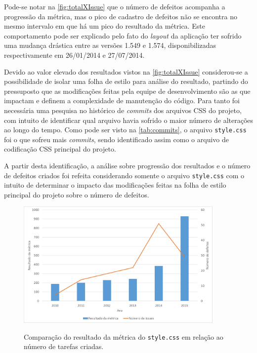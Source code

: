 Pode-se notar na \autoref{fig:totalXIssue} que o número de defeitos acompanha a progressão da métrica, mas o pico de cadastro de defeitos não se encontra no mesmo intervalo em que há um pico do resultado da métrica. Este comportamento pode ser explicado pelo fato do \textit{layout} da aplicação ter sofrido uma mudança drástica entre as versões 1.549 e 1.574, disponibilizadas respectivamente em 26/01/2014 e 27/07/2014.

Devido ao valor elevado dos resultados vistos na \autoref{fig:totalXIssue} considerou-se a possibilidade de isolar uma folha de estilo para análise do resultado, partindo do pressuposto que as modificações feitas pela equipe de desenvolvimento são as que impactam e definem a complexidade de manutenção do código. Para tanto foi necessária uma pesquisa no histórico de \textit{commits} dos arquivos CSS do projeto, com intuito de identificar qual arquivo havia sofrido o maior número de alterações ao longo do tempo. Como pode ser visto na \autoref{tab:commits}, o arquivo \texttt{style.css} foi o que sofreu mais \textit{commits}, sendo identificado assim como o arquivo de codificação CSS principal do projeto.



A partir desta identificação, a análise sobre progressão dos resultados e o número de defeitos criados foi refeita considerando somente o arquivo \texttt{style.css} com o intuito de determinar o impacto das modificações feitas na folha de estilo principal do projeto sobre o número de defeitos.

\begin{figure}[!htb]
	\centering
	\caption{Comparação do resultado da métrica do \texttt{style.css} em relação ao número de tarefas criadas.}
	\includegraphics[width=0.9\textwidth]{./04-figuras/style_issues}
	\label{fig:styleXIssues}
\end{figure}


